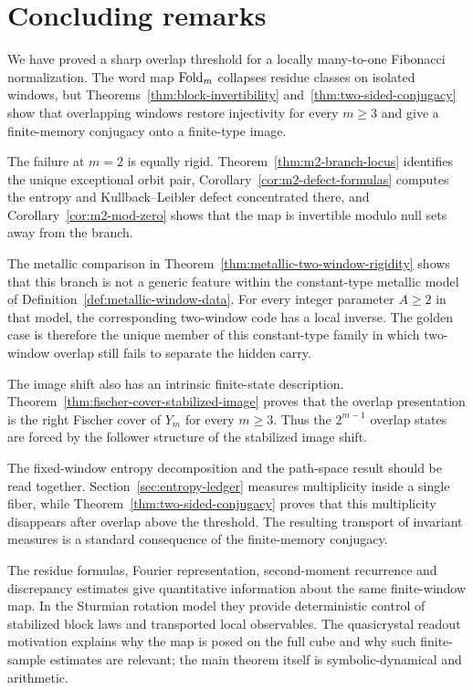 \section{Concluding remarks}\label{sec:discussion}

We have proved a sharp overlap threshold for a locally many-to-one Fibonacci normalization. The word map $\mathrm{Fold}_m$ collapses residue classes on isolated windows, but Theorems~\ref{thm:block-invertibility} and~\ref{thm:two-sided-conjugacy} show that overlapping windows restore injectivity for every $m\ge3$ and give a finite-memory conjugacy onto a finite-type image.

The failure at $m=2$ is equally rigid. Theorem~\ref{thm:m2-branch-locus} identifies the unique exceptional orbit pair, Corollary~\ref{cor:m2-defect-formulas} computes the entropy and Kullback--Leibler defect concentrated there, and Corollary~\ref{cor:m2-mod-zero} shows that the map is invertible modulo null sets away from the branch.

The metallic comparison in Theorem~\ref{thm:metallic-two-window-rigidity}
shows that this branch is not a generic feature within the constant-type
metallic model of Definition~\ref{def:metallic-window-data}. For every integer
parameter $A\ge2$ in that model, the corresponding two-window code has a local
inverse. The golden case is therefore the unique member of this constant-type
family in which two-window overlap still fails to separate the hidden carry.

The image shift also has an intrinsic finite-state description. Theorem~\ref{thm:fischer-cover-stabilized-image} proves that the overlap presentation is the right Fischer cover of $Y_m$ for every $m\ge3$. Thus the $2^{m-1}$ overlap states are forced by the follower structure of the stabilized image shift.

The fixed-window entropy decomposition and the path-space result should be read together. Section~\ref{sec:entropy-ledger} measures multiplicity inside a single fiber, while Theorem~\ref{thm:two-sided-conjugacy} proves that this multiplicity disappears after overlap above the threshold. The resulting transport of invariant measures is a standard consequence of the finite-memory conjugacy.

The residue formulas, Fourier representation, second-moment recurrence and discrepancy estimates give quantitative information about the same finite-window map. In the Sturmian rotation model they provide deterministic control of stabilized block laws and transported local observables. The quasicrystal readout motivation explains why the map is posed on the full cube and why such finite-sample estimates are relevant; the main theorem itself is symbolic-dynamical and arithmetic.
